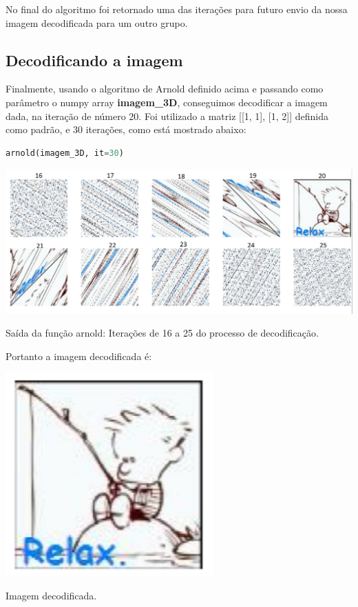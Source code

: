 \documentclass[a4paper, 12pt]{article}
\begin{document}
No final do algoritmo foi retornado uma das iterações para futuro envio da nossa imagem decodificada para um outro grupo.

\subsection{Decodificando a imagem}

Finalmente, usando o algoritmo de Arnold definido acima e passando como parâmetro o numpy array \textbf{imagem\_3D}, conseguimos decodificar a imagem dada, na iteração de número 20. Foi utilizado a matriz [[1, 1], [1, 2]] definida como padrão, e 30 iterações, como está mostrado abaixo:

\begin{lstlisting}[language=Python, caption=Chamando a função arnold para a imagem_3D]
arnold(imagem_3D, it=30)

\end{lstlisting}

\begin{center}
\includegraphics[width=16cm]{Relax_01.PNG}

Saída da função arnold: Iterações de 16 a 25 do processo de decodificação.
\end{center}

Portanto a imagem decodificada é:

\begin{center}
\includegraphics[width=8cm]{Relax.PNG}

Imagem decodificada.
\end{center}
\end{document}
